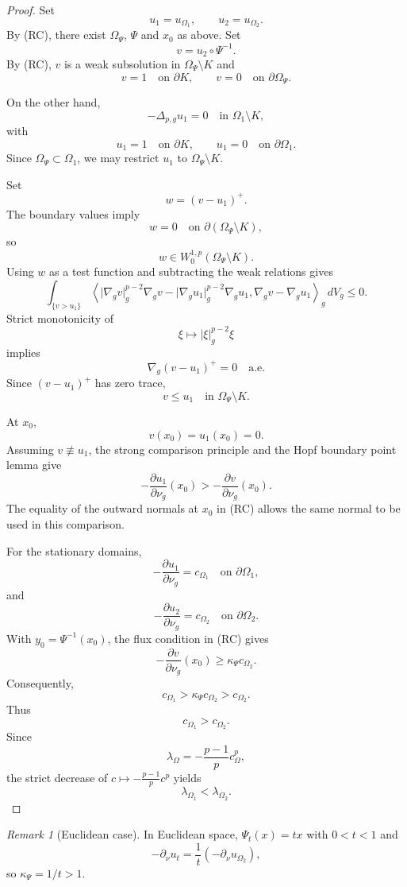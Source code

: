 \documentclass[11pt,a4paper]{article}
\theoremstyle{definition}
\theoremstyle{remark}
\newtheorem{remark}[theorem]{Remark}
\newcommand{\gradg}{\nabla_g}
\newcommand{\plapg}{\Delta_{p,g}}
\newcommand{\normg}[1]{\lvert #1\rvert_g}
\newcommand{\ipg}[2]{\left\langle #1,#2\right\rangle_g}
\begin{document}
\begin{proof}
Set
\[
u_1=u_{\Omega_1},
\qquad
u_2=u_{\Omega_2}.
\]
By (RC), there exist $\Omega_\Psi$, $\Psi$ and $x_0$ as above.
Set
\[
v=u_2\circ\Psi^{-1}.
\]
By (RC), $v$ is a weak subsolution in
$\Omega_\Psi\setminus K$ and
\[
v=1\quad\text{on }\partial K,
\qquad
v=0\quad\text{on }\partial\Omega_\Psi.
\]

On the other hand,
\[
-\plapg u_1=0
\quad\text{in }\Omega_1\setminus K,
\]
with
\[
u_1=1\quad\text{on }\partial K,
\qquad
u_1=0\quad\text{on }\partial\Omega_1.
\]
Since $\Omega_\Psi\subset\Omega_1$, we may restrict $u_1$ to
$\Omega_\Psi\setminus K$.

Set
\[
w=(v-u_1)^+.
\]
The boundary values imply
\[
w=0
\quad\text{on }\partial(\Omega_\Psi\setminus K),
\]
so
\[
w\in W_0^{1,p}(\Omega_\Psi\setminus K).
\]
Using $w$ as a test function and subtracting the weak relations gives
\[
\int_{\{v>u_1\}}
\ipg{
\normg{\gradg v}^{p-2}\gradg v
-
\normg{\gradg u_1}^{p-2}\gradg u_1
}{
\gradg v-\gradg u_1
}
\,dV_g
\leq0.
\]
Strict monotonicity of
\[
\xi\mapsto\normg{\xi}^{p-2}\xi
\]
implies
\[
\gradg(v-u_1)^+=0
\quad\text{a.e.}
\]
Since $(v-u_1)^+$ has zero trace,
\[
v\leq u_1
\quad\text{in }\Omega_\Psi\setminus K.
\]

At $x_0$,
\[
v(x_0)=u_1(x_0)=0.
\]
Assuming $v\not\equiv u_1$, the strong comparison principle and
the Hopf boundary point lemma give
\[
-\frac{\partial u_1}{\partial\nu_g}(x_0)
>
-\frac{\partial v}{\partial\nu_g}(x_0).
\]
The equality of the outward normals at $x_0$ in (RC) allows the same
normal to be used in this comparison.

For the stationary domains,
\[
-\frac{\partial u_1}{\partial\nu_g}
=c_{\Omega_1}
\quad\text{on }\partial\Omega_1,
\]
and
\[
-\frac{\partial u_2}{\partial\nu_g}
=c_{\Omega_2}
\quad\text{on }\partial\Omega_2.
\]
With $y_0=\Psi^{-1}(x_0)$, the flux condition in (RC) gives
\[
-\frac{\partial v}{\partial\nu_g}(x_0)
\geq
\kappa_\Psi c_{\Omega_2}.
\]
Consequently,
\[
c_{\Omega_1}
>
\kappa_\Psi c_{\Omega_2}
>
c_{\Omega_2}.
\]
Thus
\[
c_{\Omega_1}>c_{\Omega_2}.
\]
Since
\[
\lambda_\Omega
=
-\frac{p-1}{p}c_\Omega^p,
\]
the strict decrease of
$c\mapsto-\frac{p-1}{p}c^p$ yields
\[
\lambda_{\Omega_1}<\lambda_{\Omega_2}.
\]
\end{proof}

\begin{remark}[Euclidean case]
In Euclidean space, $\Psi_t(x)=tx$ with $0<t<1$ and
\[
-\partial_\nu u_t
=
\frac1t(-\partial_\nu u_{\Omega_2}),
\]
so $\kappa_\Psi=1/t>1$.
\end{remark}

\end{document}
